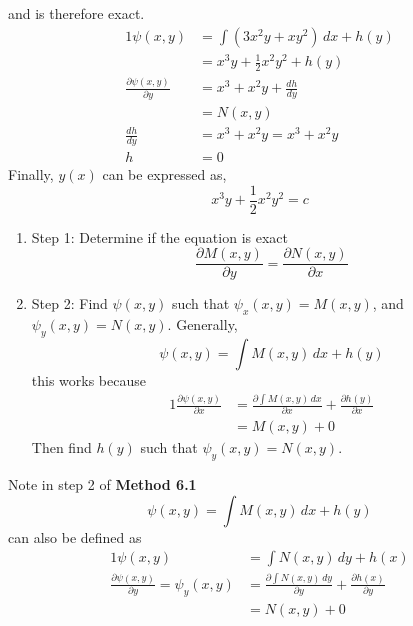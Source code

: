 \documentclass[diffeq.tex]{subfiles}
\begin{document}
\begin{example}
        and is therefore exact.
        \begin{alignat}{1}
            \psi(x, y) &= \int(3x^{2}y + xy^{2})\,dx + h(y)\\
            &= x^{3}y + \frac{1}{2}x^{2}y^{2}+h(y)\\
            \frac{\partial\psi(x, y)}{\partial y} &= x^{3} + x^{2}y + \frac{dh}{dy}\\
            &= N(x, y)\\
            \frac{dh}{dy} &= x^{3} + x^{2}y = x^{3} + x^{2}y\label{6232}\\
            h &= 0
        \end{alignat}
        Finally, $y(x)$ can be expressed as,
        \begin{equation}
            x^{3}y + \frac{1}{2}x^{2}y^{2} = c
        \end{equation}
    \end{example}
    \begin{method}
        \begin{enumerate}
            \item Step 1: Determine if the equation is exact
            \begin{equation}
                \frac{\partial M(x, y)}{\partial y} = \frac{\partial N(x, y)}{\partial x}
            \end{equation}
            \item Step 2: Find $\psi(x, y)$ such that $\psi_{x}(x, y) = M(x, y)$, and $\psi_{y}(x, y) = N(x, y)$. Generally,
            \begin{equation}
                    \psi(x, y) = \int M(x, y)\,dx + h(y)
            \end{equation}
            this works because
            \begin{alignat}{1}
                \frac{\partial \psi(x, y)}{\partial x} &= \frac{\partial \int M(x, y)\,dx}{\partial x} + \frac{\partial h(y)}{\partial x}\\
                &= M(x, y) + 0 
            \end{alignat}
            Then find $h(y)$ such that $\psi_{y}(x, y) = N(x, y)$.
        \end{enumerate}
    \end{method}
    \begin{remark}
        Note in step 2 of \textbf{Method 6.1}
        \begin{equation}
            \psi(x, y) = \int M(x, y)\,dx + h(y)
        \end{equation}
        can also be defined as
        \begin{alignat}{1}
            \psi(x, y) &= \int N(x, y)\,dy + h(x)\\
            \frac{\partial \psi(x, y)}{\partial y} = \psi_{y}(x, y) &= \frac{\partial \int N(x, y)\,dy}{\partial y} + \frac{\partial h(x)}{\partial y}\\
            &= N(x, y) + 0
        \end{alignat}
    \end{remark}
\end{document}
